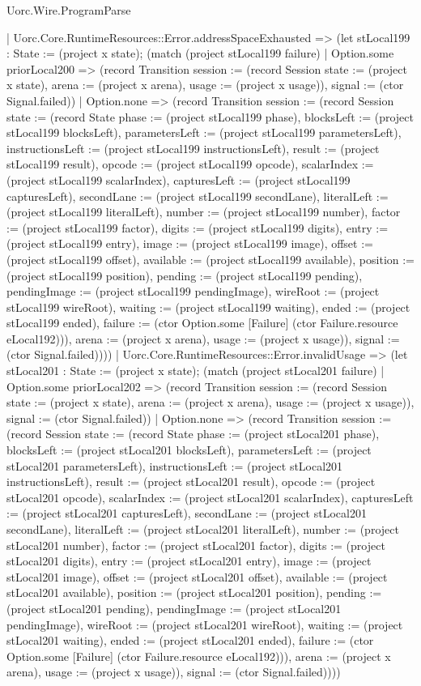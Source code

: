 \begin{lexlean}{Uorc.Wire.ProgramParse}
\begin{semanticmodule}
{      | Uorc.Core.RuntimeResources::Error.addressSpaceExhausted => (let stLocal199 : State := (project x state); (match (project stLocal199 failure)
        | Option.some priorLocal200 => (record Transition {session := (record Session {state := (project x state), arena := (project x arena), usage := (project x usage)}), signal := (ctor Signal.failed)})
        | Option.none => (record Transition {session := (record Session {state := (record State {phase := (project stLocal199 phase), blocksLeft := (project stLocal199 blocksLeft), parametersLeft := (project stLocal199 parametersLeft), instructionsLeft := (project stLocal199 instructionsLeft), result := (project stLocal199 result), opcode := (project stLocal199 opcode), scalarIndex := (project stLocal199 scalarIndex), capturesLeft := (project stLocal199 capturesLeft), secondLane := (project stLocal199 secondLane), literalLeft := (project stLocal199 literalLeft), number := (project stLocal199 number), factor := (project stLocal199 factor), digits := (project stLocal199 digits), entry := (project stLocal199 entry), image := (project stLocal199 image), offset := (project stLocal199 offset), available := (project stLocal199 available), position := (project stLocal199 position), pending := (project stLocal199 pending), pendingImage := (project stLocal199 pendingImage), wireRoot := (project stLocal199 wireRoot), waiting := (project stLocal199 waiting), ended := (project stLocal199 ended), failure := (ctor Option.some [Failure] (ctor Failure.resource eLocal192))}), arena := (project x arena), usage := (project x usage)}), signal := (ctor Signal.failed)})))
      | Uorc.Core.RuntimeResources::Error.invalidUsage => (let stLocal201 : State := (project x state); (match (project stLocal201 failure)
        | Option.some priorLocal202 => (record Transition {session := (record Session {state := (project x state), arena := (project x arena), usage := (project x usage)}), signal := (ctor Signal.failed)})
        | Option.none => (record Transition {session := (record Session {state := (record State {phase := (project stLocal201 phase), blocksLeft := (project stLocal201 blocksLeft), parametersLeft := (project stLocal201 parametersLeft), instructionsLeft := (project stLocal201 instructionsLeft), result := (project stLocal201 result), opcode := (project stLocal201 opcode), scalarIndex := (project stLocal201 scalarIndex), capturesLeft := (project stLocal201 capturesLeft), secondLane := (project stLocal201 secondLane), literalLeft := (project stLocal201 literalLeft), number := (project stLocal201 number), factor := (project stLocal201 factor), digits := (project stLocal201 digits), entry := (project stLocal201 entry), image := (project stLocal201 image), offset := (project stLocal201 offset), available := (project stLocal201 available), position := (project stLocal201 position), pending := (project stLocal201 pending), pendingImage := (project stLocal201 pendingImage), wireRoot := (project stLocal201 wireRoot), waiting := (project stLocal201 waiting), ended := (project stLocal201 ended), failure := (ctor Option.some [Failure] (ctor Failure.resource eLocal192))}), arena := (project x arena), usage := (project x usage)}), signal := (ctor Signal.failed)})))
}
\end{semanticmodule}
\end{lexlean}
